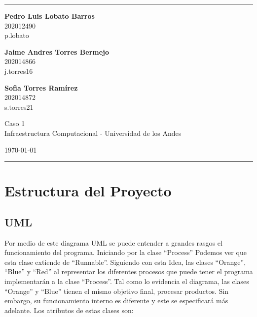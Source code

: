 \documentclass[a4paper]{article}
\begin{document}

\fancyhead[C]{}
\hrule \medskip %
\begin{minipage}{0.295\textwidth} 
\raggedright
\footnotesize
\textbf{Pedro Luis Lobato Barros} \hfill\\    
202012490\hfill\\
p.lobato

\textbf{Jaime Andres Torres Bermejo} \hfill\\   
202014866\hfill\\
j.torres16

\textbf{Sofia Torres Ramírez} \hfill\\   
202014872\hfill\\
s.torres21

\end{minipage}
\begin{minipage}{0.4\textwidth} 
\centering 
\large 
Caso 1\\ 
\normalsize 
Infraestructura Computacional - Universidad de los Andes\\ 
\end{minipage}
\begin{minipage}{0.295\textwidth} 
\raggedleft
\today\hfill\\
\end{minipage}
\medskip\hrule 
\bigskip


\section{Estructura del Proyecto}
    
    \subsection{UML}
    Por medio de este diagrama UML se puede entender a grandes rasgos el funcionamiento del programa. Iniciando por la clase “Process” Podemos ver que esta clase extiende de “Runnable”.  Siguiendo con esta Idea, las clases “Orange”, “Blue” y “Red” al representar los diferentes procesos que puede tener el programa implementarán a la clase “Process”. Tal como lo evidencia el diagrama, las clases “Orange” y “Blue” tienen el mismo objetivo final, procesar productos. Sin embargo, su funcionamiento interno es diferente y este se especificará más adelante. Los atributos de estas clases son:  
    
\end{document}
